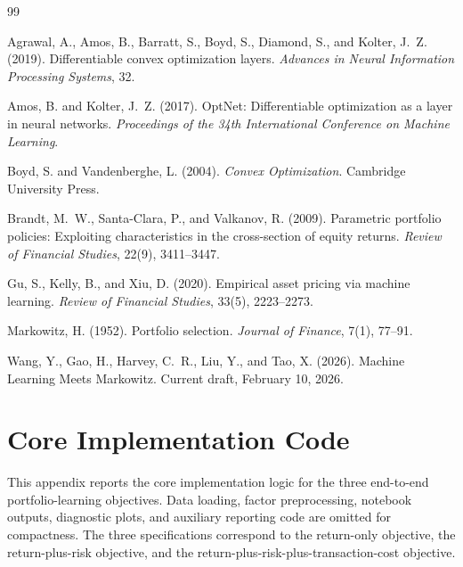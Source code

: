 \documentclass[11pt]{article}
\begin{document}
\begin{thebibliography}{99}

Agrawal, A., Amos, B., Barratt, S., Boyd, S., Diamond, S., and Kolter, J.~Z. (2019).
Differentiable convex optimization layers.
\emph{Advances in Neural Information Processing Systems}, 32.

Amos, B. and Kolter, J.~Z. (2017).
OptNet: Differentiable optimization as a layer in neural networks.
\emph{Proceedings of the 34th International Conference on Machine Learning}.

Boyd, S. and Vandenberghe, L. (2004).
\emph{Convex Optimization}.
Cambridge University Press.

Brandt, M.~W., Santa-Clara, P., and Valkanov, R. (2009).
Parametric portfolio policies: Exploiting characteristics in the cross-section of equity returns.
\emph{Review of Financial Studies}, 22(9), 3411--3447.

Gu, S., Kelly, B., and Xiu, D. (2020).
Empirical asset pricing via machine learning.
\emph{Review of Financial Studies}, 33(5), 2223--2273.

Markowitz, H. (1952).
Portfolio selection.
\emph{Journal of Finance}, 7(1), 77--91.

Wang, Y., Gao, H., Harvey, C.~R., Liu, Y., and Tao, X. (2026).
Machine Learning Meets Markowitz.
Current draft, February 10, 2026.




\clearpage
\appendix
\section{Core Implementation Code}

This appendix reports the core implementation logic for the three end-to-end portfolio-learning objectives. 
Data loading, factor preprocessing, notebook outputs, diagnostic plots, and auxiliary reporting code are omitted for compactness. 
The three specifications correspond to the return-only objective, the return-plus-risk objective, and the return-plus-risk-plus-transaction-cost objective.


\end{thebibliography}
\end{document}
